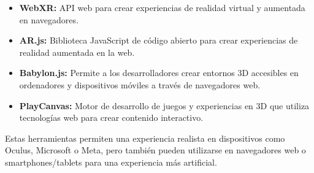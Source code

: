 \documentclass[a4paper,10pt]{article}
\begin{document}
{\begin{itemize}
			\item \textbf{WebXR:} API web para crear experiencias de realidad virtual y aumentada en navegadores.
			\item \textbf{AR.js:} Biblioteca JavaScript de código abierto para crear experiencias de realidad aumentada en la web.
			\item \textbf{Babylon.js:} Permite a los desarrolladores crear entornos 3D accesibles en ordenadores y dispositivos móviles a través de navegadores web.
			\item \textbf{PlayCanvas:} Motor de desarrollo de juegos y experiencias en 3D que utiliza tecnologías web para crear contenido interactivo.
		\end{itemize}
		Estas herramientas permiten una experiencia realista en dispositivos como Oculus, Microsoft o Meta, pero también pueden utilizarse en navegadores web o smartphones/tablets para una experiencia más artificial.}
\end{document}
